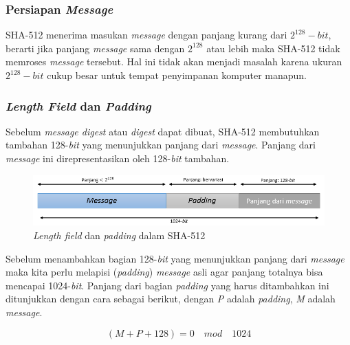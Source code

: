\subsubsection{Persiapan \textit{Message}}
\label{sssec:persiapan_message}
SHA-512 menerima masukan \textit{message} dengan panjang kurang dari \begin{math}2^{128}-\textit{bit}\end{math}, berarti jika panjang \textit{message} sama dengan \begin{math}2^{128}\end{math} atau lebih maka SHA-512 tidak memroses \textit{message} tersebut. Hal ini tidak akan menjadi masalah karena ukuran \begin{math}2^{128}-\textit{bit}\end{math} cukup besar untuk tempat penyimpanan komputer manapun.

\subsubsection{\textit{Length Field} dan \textit{Padding}}
Sebelum \textit{message digest} atau \textit{digest} dapat dibuat, SHA-512 membutuhkan tambahan 128-\textit{bit} yang menunjukkan panjang dari \textit{message}. Panjang dari \textit{message} ini direpresentasikan oleh 128-\textit{bit} tambahan.

\begin{figure}[ht]
	\includegraphics[scale=0.6]{Gambar/length_field_padding}
	\centering
	\caption{\textit{Length field} dan \textit{padding} dalam SHA-512}
\end{figure}

Sebelum menambahkan bagian 128-\textit{bit} yang menunjukkan panjang dari \textit{message} maka kita perlu melapisi (\textit{padding}) \textit{message} asli agar panjang totalnya bisa mencapai 1024-\textit{bit}. Panjang dari bagian \textit{padding} yang harus ditambahkan ini ditunjukkan dengan cara sebagai berikut, dengan \textit{P} adalah \textit{padding}, \textit{M} adalah \textit{message}.

\begin{displaymath}
	(M + P + 128) = 0\quad mod\quad 1024
\end{displaymath}

